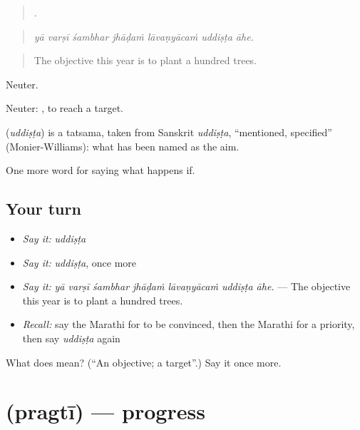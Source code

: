 \begin{quote}
      .
\end{quote}

\begin{quote}
\emph{yā varṣī śambhar jhāḍaṁ lāvaṇyācaṁ uddiṣṭa āhe.}
\end{quote}

\begin{quote}
The objective this year is to plant a hundred trees.
\end{quote}

Neuter.

Neuter:  , to reach a target.

\begin{cousinweb}
\textbf{} (\emph{uddiṣṭa}) is a tatsama, taken from Sanskrit \emph{uddiṣṭa}, \textquotedblleft{}mentioned, specified\textquotedblright{} (Monier-Williams): what has been named as the aim.
\end{cousinweb}

\begin{grammarlens}[title={What you've built}]
One more word for saying what happens if.
\end{grammarlens}

\subsection*{Your turn}
\begin{itemize}
\raggedright
  \item \emph{Say it:} \emph{uddiṣṭa}
  \item \emph{Say it:} \emph{uddiṣṭa}, once more
  \item \emph{Say it:} \emph{yā varṣī śambhar jhāḍaṁ lāvaṇyācaṁ uddiṣṭa āhe.} — The objective this year is to plant a hundred trees.
  \item \emph{Recall:} say the Marathi for to be convinced, then the Marathi for a priority, then say \emph{uddiṣṭa} again
\end{itemize}

\begin{tcolorbox}[breakable,colback=teal!4,colframe=teal!35!black,title={Before you move on}]
What does  mean? (\textquotedblleft{}An objective; a target\textquotedblright{}.) Say it once more.
\end{tcolorbox}
\section[\texorpdfstring{\mr{प्रगती} (pragtī)}{प्रगती (pragtī)}]{ (pragtī) — progress}

